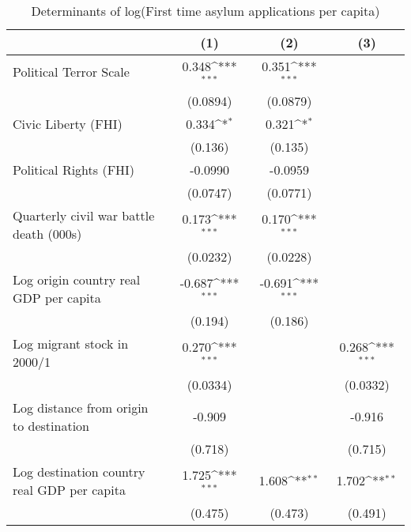 \begin{table}[htbp]\centering
\def\sym#1{\ifmmode^{#1}\else\(^{#1}\)\fi}
\caption{Determinants of log(First time asylum applications per capita)}
\begin{tabular}{l*{3}{c}}
\hline\hline
                    &\multicolumn{1}{c}{(1)}         &\multicolumn{1}{c}{(2)}         &\multicolumn{1}{c}{(3)}         \\
\hline
Political Terror Scale&       0.348\sym{***}&       0.351\sym{***}&                     \\
                    &    (0.0894)         &    (0.0879)         &                     \\
[1em]
Civic Liberty (FHI) &       0.334\sym{*}  &       0.321\sym{*}  &                     \\
                    &     (0.136)         &     (0.135)         &                     \\
[1em]
Political Rights (FHI)&     -0.0990         &     -0.0959         &                     \\
                    &    (0.0747)         &    (0.0771)         &                     \\
[1em]
Quarterly civil war battle death (000s)&       0.173\sym{***}&       0.170\sym{***}&                     \\
                    &    (0.0232)         &    (0.0228)         &                     \\
[1em]
Log origin country real GDP per capita&      -0.687\sym{***}&      -0.691\sym{***}&                     \\
                    &     (0.194)         &     (0.186)         &                     \\
[1em]
Log migrant stock in 2000/1&       0.270\sym{***}&                     &       0.268\sym{***}\\
                    &    (0.0334)         &                     &    (0.0332)         \\
[1em]
Log distance from origin to destination&      -0.909         &                     &      -0.916         \\
                    &     (0.718)         &                     &     (0.715)         \\
[1em]
Log destination country real GDP per capita&       1.725\sym{***}&       1.608\sym{**} &       1.702\sym{**} \\
                    &     (0.475)         &     (0.473)         &     (0.491)         \\

\end{tabular}
\end{table}
